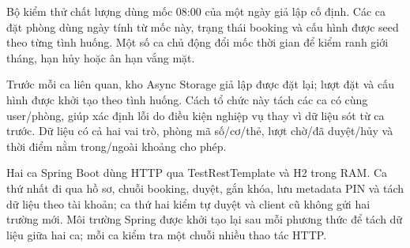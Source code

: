 Bộ kiểm thử chất lượng dùng mốc 08:00 của một ngày giả lập cố định. Các ca đặt phòng dùng ngày tính từ mốc này, trạng thái booking và cấu hình được seed theo từng tình huống. Một số ca chủ động đổi mốc thời gian để kiểm ranh giới tháng, hạn hủy hoặc ân hạn vắng mặt.

Trước mỗi ca liên quan, kho Async Storage giả lập được đặt lại; lượt đặt và cấu hình được khởi tạo theo tình huống. Cách tổ chức này tách các ca có cùng user/phòng, giúp xác định lỗi do điều kiện nghiệp vụ thay vì dữ liệu sót từ ca trước. Dữ liệu có cả hai vai trò, phòng mã số/cơ/thẻ, lượt chờ/đã duyệt/hủy và thời điểm nằm trong/ngoài khoảng cho phép.

Hai ca Spring Boot dùng HTTP qua TestRestTemplate và H2 trong RAM. Ca thứ nhất đi qua hồ sơ, chuỗi booking, duyệt, gắn khóa, lưu metadata PIN và tách dữ liệu theo tài khoản; ca thứ hai kiểm tự duyệt và client cũ không gửi hai trường mới. Môi trường Spring được khởi tạo lại sau mỗi phương thức để tách dữ liệu giữa hai ca; mỗi ca kiểm tra một chuỗi nhiều thao tác HTTP.

